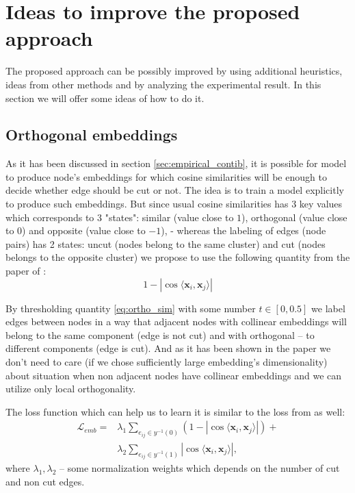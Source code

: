 \documentclass[10pt, twocolumn, a4paper]{article}
\theoremstyle{definition}
\begin{document}
\section{Ideas to improve the proposed approach}
The proposed approach can be possibly improved by using additional heuristics,
ideas from other methods and by analyzing the experimental result. In this section
we will offer some ideas of how to do it.

\subsection{Orthogonal embeddings} \label{sec:ortho_emb}
As it has been discussed in section \ref{sec:empirical_contib}, it is possible for model
to produce node's embeddings for which cosine similarities will be enough to decide whether
edge should be cut or not. The idea is to train a model explicitly to produce such embeddings.
But since usual cosine similarities has 3 key values which corresponds to 3 "states":
similar (value close to $1$), orthogonal (value close to $0$) and opposite (value close to $-1$), -
whereas the labeling of edges (node pairs) has 2 states: uncut (nodes belong to the same cluster) and cut
(nodes belongs to the opposite cluster) we propose to use the following quantity from the paper
of \citet{chen2019instance}:
\begin{equation} \label{eq:ortho_sim}
    1 - |\cos \langle \mathbf{x}_i, \mathbf{x}_j \rangle|
\end{equation}

By thresholding quantity \eqref{eq:ortho_sim} with some number $t \in [0, 0.5]$ we label edges between nodes
in a way that adjacent nodes with collinear embeddings will belong to the same component (edge is not cut)
and with orthogonal -- to different components (edge is cut). And as it has been shown in the
paper we don't need to care (if we chose sufficiently large embedding's dimensionality)
about situation when non adjacent nodes have collinear embeddings and we can utilize only local orthogonality.

The loss function which can help us to learn it is similar to the loss from \citet{chen2019instance} as well:
\begin{align} \label{eq:ortho_loss}
    \mathcal{L}_{emb} =
     & \lambda_1 \sum\limits_{e_{ij} \in y^{-1}(0)} \left(1 - |\cos \langle \mathbf{x}_i, \mathbf{x}_j \rangle| \right) + \\
     & \lambda_2 \sum\limits_{e_{ij} \in y^{-1}(1)} |\cos \langle \mathbf{x}_i, \mathbf{x}_j \rangle|,
\end{align}
where $\lambda_1, \lambda_2$ -- some normalization weights which depends on the number of cut and non cut edges.
\end{document}
